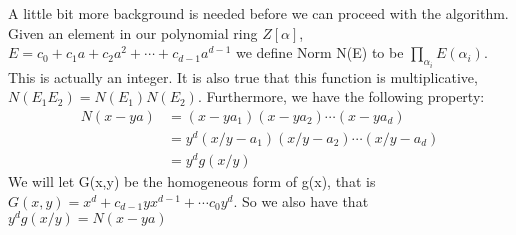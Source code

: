 \documentclass{article}
\begin{document}
A little bit more background is needed before we can proceed with the algorithm. Given an element in our polynomial ring $Z[\alpha]$, $E = c_0 + c_1 a + c_2 a^2 + \cdots + c_{d-1} a^{d-1}$ we define Norm N(E) to be $\prod_{\alpha_i } E(\alpha_i)$. This is actually an integer. It is also true that this function is multiplicative, $N(E_1 E_2) = N(E_1) N(E_2)$. Furthermore, we have the following property:
\begin{align}
    N(x - y a) &= (x - y a_1) (x - y a_2 ) \cdots (x - y a_d) \\
    &= y^d (x/y - a_1) (x/y - a_2 ) \cdots (x/y - a_d) \\
    &= y^d g(x/y)
\end{align}
We will let G(x,y) be the homogeneous form of g(x), that is $G(x,y) = x^d + c_{d-1} y x^{d-1} + \cdots c_0 y^d $. So we also have that $y^d g(x/y) = N(x - y a) $
\end{document}
